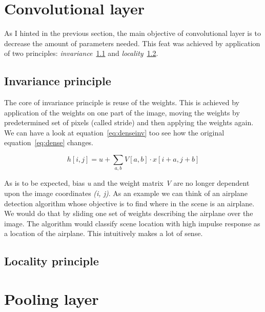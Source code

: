 \section{Convolutional layer}\label{sec:convolutional}
As I hinted in the previous section, the main objective of convolutional layer is to decrease the amount of parameters
needed.
This feat was achieved by application of two principles: \textit{invariance}~\ref{subsec:invariance} and
\textit{locality}~\ref{subsec:locality}.

\subsection{Invariance principle}\label{subsec:invariance}
The core of invariance principle is reuse of the weights.
This is achieved by application of the weights on one part of the image, moving the weights by predetermined set
of pixels (called stride) and then applying the weights again.
We can have a look at equation~\ref{eq:denseinv} too see how the original equation~\ref{eq:dense} changes.

\begin{equation}\label{eq:denseinv}
h[i, j] = u + \sum_{a,b} V[a,b] \cdot x[i+a,j+b]
\end{equation}

As is to be expected, bias \textit{u} and the weight matrix \textit{V} are no longer dependent upon the image
coordinates \textit{(i, j)}.
As an example we can think of an airplane detection algorithm whose objective is to find where in the scene is an
airplane.
We would do that by sliding one set of weights describing the airplane over the image.
The algorithm would classify scene location with high impulse response as a location of the airplane.
This intuitively makes a lot of sense.

\subsection{Locality principle}\label{subsec:locality}

\section{Pooling layer}\label{sec:pooling}

